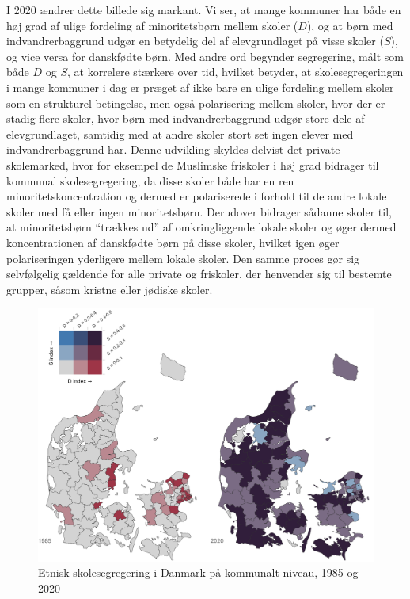 \documentclass[
]{book}
\begin{document}
I 2020 ændrer dette billede sig markant. Vi ser, at mange kommuner har både en høj grad af ulige fordeling af minoritetsbørn mellem skoler (\(D\)), og at børn med indvandrerbaggrund udgør en betydelig del af elevgrundlaget på visse skoler (\(S\)), og vice versa for danskfødte børn. Med andre ord begynder segregering, målt som både \(D\) og \(S\), at korrelere stærkere over tid, hvilket betyder, at skolesegregeringen i mange kommuner i dag er præget af ikke bare en ulige fordeling mellem skoler som en strukturel betingelse, men også polarisering mellem skoler, hvor der er stadig flere skoler, hvor børn med indvandrerbaggrund udgør store dele af elevgrundlaget, samtidig med at andre skoler stort set ingen elever med indvandrerbaggrund har. Denne udvikling skyldes delvist det private skolemarked, hvor for eksempel de Muslimske friskoler i høj grad bidrager til kommunal skolesegregering, da disse skoler både har en ren minoritetskoncentration og dermed er polariserede i forhold til de andre lokale skoler med få eller ingen minoritetsbørn. Derudover bidrager sådanne skoler til, at minoritetsbørn ``trækkes ud'' af omkringliggende lokale skoler og øger dermed koncentrationen af danskfødte børn på disse skoler, hvilket igen øger polariseringen yderligere mellem lokale skoler. Den samme proces gør sig selvfølgelig gældende for alle private og friskoler, der henvender sig til bestemte grupper, såsom kristne eller jødiske skoler.

\begin{figure}
\includegraphics[width=1\linewidth]{images/Figur4} \caption{Etnisk skolesegregering i Danmark på kommunalt niveau, 1985 og 2020}\label{fig:fig-3-3}
\end{figure}
\end{document}
